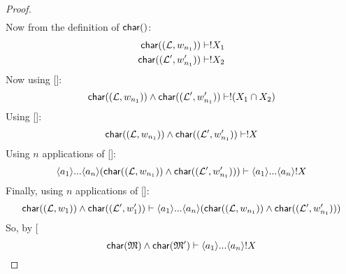 \begin{proof}
\begin{eqnarray*}
\end{eqnarray*}
Now from the definition of $\mathsf{char}()$:
\begin{eqnarray*}
\mathsf{char}((\mathcal{L}, w_{n_1})) \vdash ! X_1 \\
\mathsf{char}((\mathcal{L}', w'_{n_1})) \vdash ! X_2
\end{eqnarray*}
Now using []:
\[
\mathsf{char}((\mathcal{L}, w_{n_1})) \land \mathsf{char}((\mathcal{L}', w'_{n_1})) \vdash ! (X_1 \cap X_2)
\]
Using []:
\[
\mathsf{char}((\mathcal{L}, w_{n_1})) \land \mathsf{char}((\mathcal{L}', w'_{n_1})) \vdash ! X
\]
Using $n$ applications of []:
\[
\langle a_1 \rangle ... \langle a_n \rangle (\mathsf{char}((\mathcal{L}, w_{n_1})) \land \mathsf{char}((\mathcal{L}', w'_{n_1}))) \vdash \langle a_1 \rangle ... \langle a_n \rangle ! X
\]
Finally, using $n$ applications of []:
\[
\mathsf{char}( (\mathcal{L}, w_1)) \land \mathsf{char}( (\mathcal{L}', w'_1)) \vdash \langle a_1 \rangle ... \langle a_n \rangle (\mathsf{char}((\mathcal{L}, w_{n_1})) \land \mathsf{char}((\mathcal{L}', w'_{n_1})))
\]
So, by [\RULENAME{Trans]}
\[
\mathsf{char}(\frak{M}) \land \mathsf{char}(\frak{M}') \vdash \langle a_1 \rangle ... \langle a_n \rangle ! X
\]
\end{proof}
